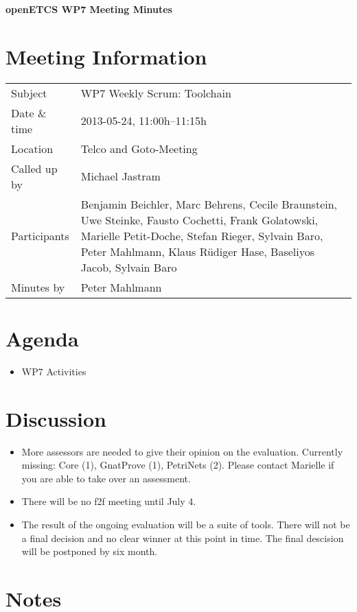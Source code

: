 \documentclass[a4paper, 11pt]{article}
\begin{document}
{\begin{center}\huge\bf openETCS WP7 Meeting Minutes\end{center}}
\section{Meeting Information}

\renewcommand{\arraystretch}{1.5}
\begin{supertabular}{m{.2\textwidth}m{.8\textwidth}}
Subject & WP7 Weekly Scrum: Toolchain\\
Date \& time & 2013-05-24, 11:00h--11:15h\\
Location & Telco and Goto-Meeting\\
Called up by & Michael Jastram\\
Participants &
Benjamin Beichler,
Marc Behrens,
Cecile Braunstein,
Uwe Steinke,
Fausto Cochetti,
Frank Golatowski,
Marielle Petit-Doche,
Stefan Rieger,
Sylvain Baro,
Peter Mahlmann,
Klaus R\"udiger Hase,
Baseliyos Jacob,
Sylvain Baro
\\

Minutes by & Peter Mahlmann\\

\end{supertabular}
\renewcommand{\arraystretch}{1.0}


\section{Agenda}
\begin{itemize}
\item WP7 Activities
\end{itemize}

\section{Discussion}

\begin{itemize}
\item More assessors are needed to give their opinion on the evaluation. Currently missing: Core (1), GnatProve (1), PetriNets (2). Please contact Marielle if you are able to take over an assessment.
\item There will be no f2f meeting until July 4.
\item The result of the ongoing evaluation will be a suite of tools. There will not be a final decision and no clear winner at this point in time. The final descision will be postponed by six month.


\end{itemize}

\section{Notes}
\end{document}
